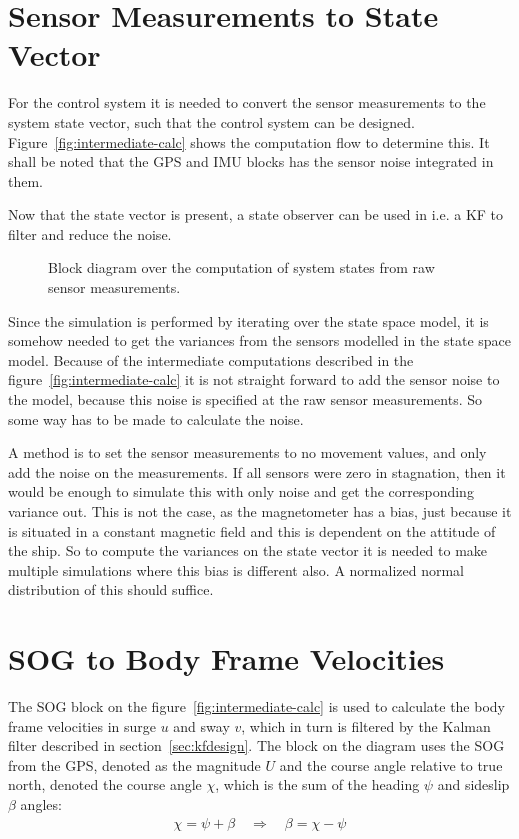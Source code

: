 \section{Sensor Measurements to State Vector}
For the control system it is needed to convert the sensor measurements
to the system state vector, such that the control system can be
designed. Figure~\vref{fig:intermediate-calc} shows the computation
flow to determine this. It shall be noted that the \ac{GPS} and
\ac{IMU} blocks has the sensor noise integrated in them.

Now that the state vector is present, a state observer can be used
in i.e. a \ac{KF} to filter and reduce the noise.

\begin{figure}
	\centering
	
	\caption{Block diagram over the computation of system states from
	raw sensor measurements.}
	\label{fig:intermediate-calc}
\end{figure}

Since the simulation is performed by iterating over the state space
model, it is somehow needed to get the variances from the sensors
modelled in the state space model. Because of the intermediate
computations described in the figure~\vref{fig:intermediate-calc} it
is not straight forward to add the sensor noise to the model, because
this noise is specified at the raw sensor measurements. So some way
has to be made to calculate the noise.

A method is to set the sensor measurements to no movement values, and
only add the noise on the measurements. If all sensors were zero in
stagnation, then it would be enough to simulate this with only noise and
get the corresponding variance out. This is not the case, as the
magnetometer has a bias, just because it is situated in a constant
magnetic field and this is dependent on the attitude of the ship. So
to compute the variances on the state vector it is needed to make
multiple simulations where this bias is different also. A normalized
normal distribution of this should suffice.

\section{\acs{SOG} to Body Frame Velocities}
The \acl{SOG} block on the figure~\vref{fig:intermediate-calc} is used to calculate the body frame velocities in surge $u$ and sway $v$, which in turn is filtered by the Kalman filter described in section~\vref{sec:kfdesign}. The block on the diagram uses the \ac{SOG} from the \ac{GPS}, denoted as the magnitude $U$ and the course angle relative to true north, denoted the course angle $\chi$, which is the sum of the heading $\psi$ and sideslip $\beta$ angles:
\begin{align}
\chi = \psi + \beta \quad \Rightarrow  \quad \beta = \chi - \psi
\label{eq:angles}
\end{align}

